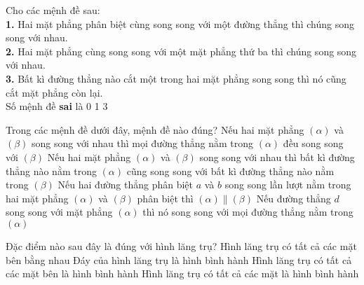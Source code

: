 \begin{ex}%
	Cho các mệnh đề sau:\\
	\textbf{1.} Hai mặt phẳng phân biệt cùng song song với một đường thẳng thì chúng song song với nhau.\\
	\textbf{2.} Hai mặt phẳng cùng song song với một mặt phẳng thứ ba thì chúng song song với nhau.\\
	\textbf{3.} Bất kì đường thẳng nào cắt một trong hai mặt phẳng song song thì nó cũng cắt mặt phẳng còn lại.\\
	Số mệnh đề \textbf{sai} là
	\choice
	{0}
	{1}
	{3}
	{}
\end{ex}

\begin{ex}%
	Trong các mệnh đề dưới đây, mệnh đề nào đúng?
	\choice
	{\True Nếu hai mặt phẳng $(\alpha)$ và $(\beta)$ song song với nhau thì mọi đường thẳng nằm trong $(\alpha)$ đều song song với $(\beta)$}
	{Nếu hai mặt phẳng $(\alpha)$ và $(\beta)$ song song với nhau thì bất kì đường thẳng nào nằm trong $(\alpha)$ cũng song song với bất kì đường thẳng nào nằm trong $(\beta)$}
	{Nếu hai đường thẳng phân biệt $a$ và $b$ song song lần lượt nằm trong hai mặt phẳng $(\alpha)$ và $(\beta)$ phân biệt thì $(\alpha)\parallel (\beta) $}
	{Nếu đường thẳng $d $ song song với mặt phẳng $(\alpha)$ thì nó song song với mọi đường thẳng nằm trong $(\alpha)$}
\end{ex}


\begin{ex}%
	Đặc điểm nào sau đây là đúng với hình lăng trụ?
	\choice
	{Hình lăng trụ có tất cả các mặt bên bằng nhau}
	{Đáy của hình lăng trụ là hình bình hành}
	{\True Hình lăng trụ có tất cả các mặt bên là hình bình hành}
	{Hình lăng trụ có tất cả các mặt là hình bình hành}
\end{ex}

